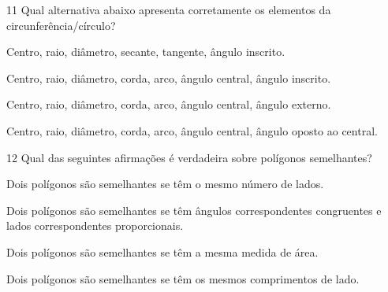 
\num{11} Qual alternativa abaixo apresenta corretamente os elementos da
circunferência/círculo?

\begin{escolha}
\item Centro, raio, diâmetro, secante, tangente, ângulo inscrito.
\item Centro, raio, diâmetro, corda, arco, ângulo central, ângulo inscrito.
\item Centro, raio, diâmetro, corda, arco, ângulo central, ângulo externo.
\item Centro, raio, diâmetro, corda, arco, ângulo central, ângulo oposto ao
central.
\end{escolha}



\num{12} Qual das seguintes afirmações é verdadeira sobre polígonos
semelhantes?

\begin{escolha}
\item Dois polígonos são semelhantes se têm o mesmo número de lados.
\item Dois polígonos são semelhantes se têm ângulos correspondentes
congruentes e lados correspondentes proporcionais.
\item Dois polígonos são semelhantes se têm a mesma medida de área.
\item Dois polígonos são semelhantes se têm os mesmos comprimentos de lado.
\end{escolha}

